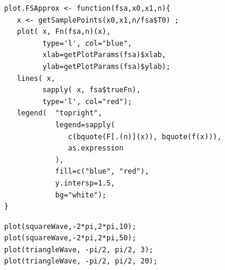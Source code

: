 \documentclass{beamer}
\begin{document}
\begin{frame}[fragile]
   \begin{center}
   \begin{minipage}{100mm}
   \begin{lstlisting}
      plot.FSApprox <- function(fsa,x0,x1,n){
         x <- getSamplePoints(x0,x1,n/fsa$T0) ;
         plot( x, Fn(fsa,n)(x), 
               type='l', col="blue", 
               xlab=getPlotParams(fsa)$xlab, 
               ylab=getPlotParams(fsa)$ylab);
         lines( x, 
               sapply( x, fsa$trueFn),
               type='l', col="red");
         legend(  "topright", 
                  legend=sapply(
                     c(bquote(F[.(n)](x)), bquote(f(x))),
                     as.expression
                  ), 
                  fill=c("blue", "red"),
                  y.intersp=1.5,
                  bg="white");
      }
   \end{lstlisting}
   \end{minipage}
   \end{center}
\end{frame}

\begin{frame}[fragile]
   \begin{center}
   \begin{minipage}{100mm}
   \begin{lstlisting}
      plot(squareWave,-2*pi,2*pi,10);
      plot(squareWave,-2*pi,2*pi,50);
      plot(triangleWave, -pi/2, pi/2, 3);
      plot(triangleWave, -pi/2, pi/2, 20);
   \end{lstlisting}
   \end{minipage}
   \end{center}
\end{frame}
\end{document}
